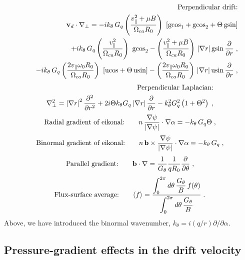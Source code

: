 \begin{eqnarray}
\mbox{Perpendicular drift:} & \nonumber \\
\mathbf{v}_d \cdot \nabla_\perp = 
-i k_\theta \,G_q \left( \frac{v_\parallel^2+\mu B}{\Omega_{ca} R_0} \right) \, \,
\left[ \text{gcos}_1 + \text{gcos}_2 + \Theta \, \text{gsin} \right] & \nonumber \\ 
\qquad +i k_\theta \,G_q \left( \frac{v_\parallel^2}{\Omega_{ca} R_0} \right) \, \,  
 \text{gcos}_2 
-\left( \frac{v_\parallel^2+\mu B}{\Omega_{ca} R_0} \right) \, |\nabla r| \,
\text{gsin} \, \frac{\partial}{\partial r} \; , & \nonumber \\
\qquad -i k_\theta \,G_q \left( \frac{2v_\parallel \omega_0 R_0}{\Omega_{ca} R_0} \right) \, \,  
 \left[ \text{ucos} + \Theta \, \text{usin} \right]
-\left( \frac{2v_\parallel\omega_0 R_0}{\Omega_{ca} R_0} \right) \, |\nabla r| \,
\text{usin} \, \frac{\partial}{\partial r} \; , \label{eq.mdrift} &
\end{eqnarray}
\begin{eqnarray}
\mbox{Perpendicular Laplacian:} & \nonumber \\
\nabla_\perp^2 = \left| \nabla r \right|^2 \frac{\partial^2}{\partial r^2} 
+ 2 i \Theta k_\theta G_q \left| \nabla r \right| \frac{\partial}{\partial r} 
- k_\theta^2 G_q^2 \left( 1+\Theta^2 \right) \; , &
\end{eqnarray}
\begin{equation}
\mbox{Radial gradient of eikonal:}\qquad
n \, \frac{\nabla\psi}{\left|\nabla\psi\right|} \cdot \nabla\alpha = 
-k_\theta \, G_q \Theta \; , 
\end{equation}
\begin{equation}
\mbox{Binormal gradient of eikonal:}\qquad
n \, \mathbf{b}\times\frac{\nabla\psi}{\left|\nabla\psi\right|} \cdot 
 \nabla\alpha =
- k_\theta \, G_q \; ,
\end{equation}
\begin{equation}
\mbox{Parallel gradient:}\qquad
\mathbf{b} \cdot \nabla = \frac{1}{G_\theta}\frac{1}{q R_0} 
 \frac{\partial}{\partial\theta} \; ,
\end{equation}
\begin{equation}
\mbox{Flux-surface average:}\qquad
\langle f \rangle = 
 \frac{\displaystyle \int_0^{2\pi} d\theta \, \frac{\mt}{B} \, f(\theta)}{%
       \displaystyle \int_0^{2\pi} d\theta \, \frac{\mt}{B}} \; .
\end{equation}
%
Above, we have introduced the binormal wavenumber, 
$k_\theta = i (q/r) \partial/\partial\alpha$.  

\subsection{Pressure-gradient effects in the drift velocity}

